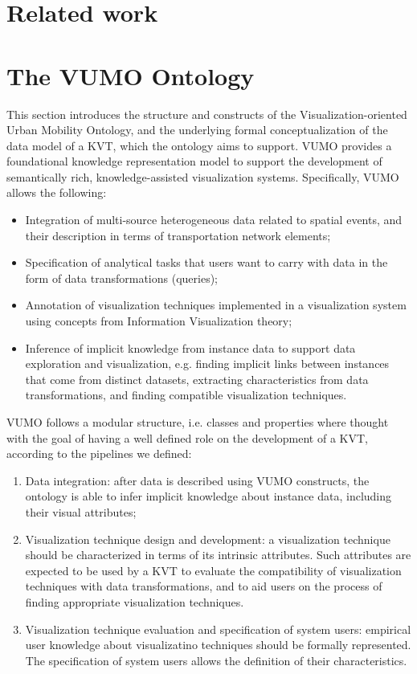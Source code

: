 \section{Related work}
\label{sec:relatedwork}



\section{The VUMO Ontology}
\label{sec:vumo}

This section introduces the structure and constructs of the Visualization-oriented Urban Mobility Ontology, and the underlying formal conceptualization of the data model of a KVT, which the ontology aims to support. VUMO provides a foundational knowledge representation model to support the development of semantically rich, knowledge-assisted visualization systems. Specifically, VUMO allows the following:

\begin{itemize}
    \item Integration of multi-source heterogeneous data related to spatial events, and their description in terms of transportation network elements;
    \item Specification of analytical tasks that users want to carry with data in the form of data transformations (queries);
    \item Annotation of visualization techniques implemented in a visualization system using concepts from Information Visualization theory;
    \item Inference of implicit knowledge from instance data to support data exploration and visualization, e.g. finding implicit links between instances that come from distinct datasets, extracting characteristics from data transformations, and finding compatible visualization techniques.
\end{itemize}

VUMO follows a modular structure, i.e. classes and properties where thought with the goal of having a well defined role on the development of a KVT, according to the pipelines we defined:

\begin{enumerate}
    \item Data integration: after data is described using VUMO constructs, the ontology is able to infer implicit knowledge about instance data, including their visual attributes;
    \item Visualization technique design and development: a visualization technique should be characterized in terms of its intrinsic attributes. Such attributes are expected to be used by a KVT to evaluate the compatibility of visualization techniques with data transformations, and to aid users on the process of finding appropriate visualization techniques.
    \item Visualization technique evaluation and specification of system users: empirical user knowledge about visualizatino techniques should be formally represented. The specification of system users allows the definition of their characteristics.
\end{enumerate}

